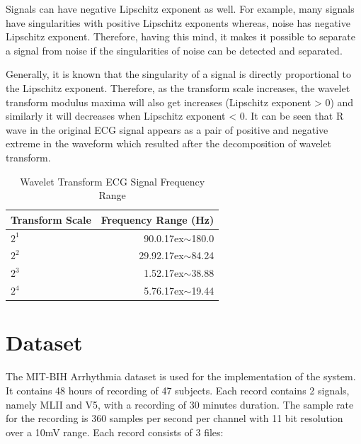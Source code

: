 Signals can have negative Lipschitz exponent as well. For example, many signals have singularities with positive Lipschitz exponents whereas, noise has negative Lipschitz exponent. Therefore, having this mind, it makes it possible to separate a signal from noise if the singularities of noise can be detected and separated.

Generally, it is known that the singularity of a signal is directly proportional to the Lipschitz exponent. Therefore, as the transform scale increases, the wavelet transform modulus maxima will also get increases (Lipschitz exponent > 0) and similarly it will decreases when Lipschitz exponent < 0. It can be seen that R wave in the original ECG signal appears as a pair of positive and negative extreme in the waveform which resulted after the decomposition of wavelet transform.


 
\renewcommand{\arraystretch}{2}
\begin{table}
	\caption{Wavelet Transform ECG Signal Frequency Range} \label{tab:sometab}
	
	\begin{center}
		\begin{tabular}{ | l | r | }
			\hline
			Transform Scale & Frequency Range (Hz) \\ \hline
			${2^1}$  & 90.0{\raise.17ex\hbox{$\scriptstyle\sim$}}180.0 \\ \hline
			${2^2}$  & 29.92{\raise.17ex\hbox{$\scriptstyle\sim$}}84.24  \\ \hline
			${2^3}$  & 1.52{\raise.17ex\hbox{$\scriptstyle\sim$}}38.88  \\ \hline
			${2^4}$  & 5.76{\raise.17ex\hbox{$\scriptstyle\sim$}}19.44  \\ 
			\hline
		\end{tabular}
	\end{center}
	
\end{table}


\section{Dataset}

The MIT-BIH Arrhythmia dataset is used for the implementation of the system. It contains 48 hours of recording of 47 subjects. Each record contains 2 signals, namely MLII and V5, with a recording of 30 minutes duration. The sample rate for the recording is 360 samples per second per channel with 11 bit resolution over a 10mV range. Each record consists of 3 files:

